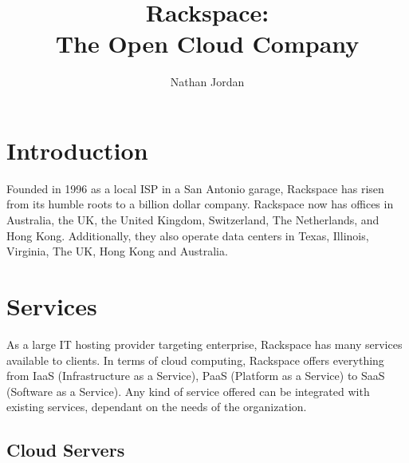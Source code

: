 \documentclass[DIV=calc, paper=letter, fontsize=12pt, twocolumn]{scrartcl}	 %
\title{{\color{goldfishOrange}Rackspace:}\\The Open Cloud Company} %
\author{Nathan Jordan } %
\date{} %
\newcommand{\initial}[1]{ %
\lettrine[lines=3,lhang=0.3,nindent=0em]{
\color{goldfishWater}
{\textsf{#1}}}{}}
\begin{document}
\maketitle %

\thispagestyle{fancy} %



\color{dark-gray}



\section*{\color{goldfishOrange}Introduction}

Founded in 1996 as a local ISP in a San Antonio garage, Rackspace has risen
from its humble roots to a billion dollar company. Rackspace now has offices
in Australia, the UK, the United Kingdom, Switzerland, The Netherlands, and Hong
Kong. Additionally, they also operate data centers in Texas, Illinois, Virginia, The UK,
Hong Kong and Australia. 

\section*{\color{goldfishOrange}Services}

As a large IT hosting provider targeting enterprise, Rackspace has many
services available to clients. In terms of cloud computing, Rackspace
offers everything from IaaS (Infrastructure as a Service), PaaS (Platform as a Service)
to SaaS (Software as a Service). Any kind of service offered can be integrated
with existing services, dependant on the needs of the organization.

\subsection*{\color{goldfishWater}Cloud Servers}
\end{document}
